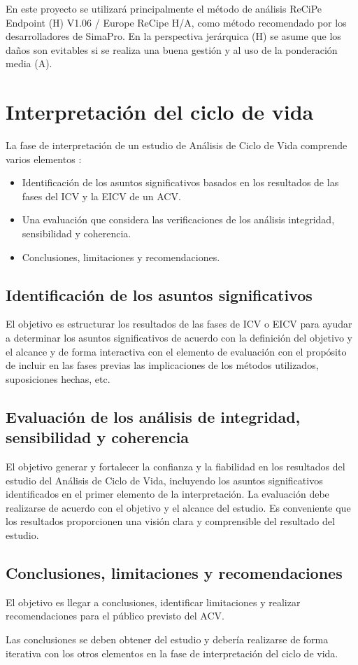 En este proyecto se utilizará principalmente el método de análisis ReCiPe Endpoint (H) V1.06 / Europe ReCipe H/A, como método recomendado por los desarrolladores de SimaPro. En la perspectiva jerárquica (H) se asume que los daños son evitables si se realiza una buena gestión y al uso de la ponderación media (A).

\section{Interpretación del ciclo de vida}

La fase de interpretación de un estudio de Análisis de Ciclo de Vida comprende varios elementos \cite{iso14044}:
\begin{itemize}
  \item Identificación de los asuntos significativos basados en los resultados de las fases del ICV y la EICV de un ACV.
  \item Una evaluación que considera las verificaciones de los análisis integridad, sensibilidad y coherencia.
  \item Conclusiones, limitaciones y recomendaciones.
\end{itemize}

\subsection{Identificación de los asuntos significativos}

El objetivo es estructurar los resultados de las fases de ICV o EICV para ayudar a determinar los asuntos significativos de acuerdo con la definición del objetivo y el alcance y de forma interactiva con el elemento de evaluación con el propósito de incluir en las fases previas las implicaciones de los métodos utilizados, suposiciones hechas, etc.

\subsection{Evaluación de los análisis de integridad, sensibilidad y coherencia}

El objetivo generar y fortalecer la confianza y la fiabilidad en los resultados del estudio del Análisis de Ciclo de Vida, incluyendo los asuntos significativos identificados en el primer elemento de la interpretación. La evaluación debe realizarse de acuerdo con el objetivo y el alcance del estudio. Es conveniente que los resultados proporcionen una visión clara y comprensible del resultado del estudio.

\subsection{Conclusiones, limitaciones y recomendaciones}

El objetivo es llegar a conclusiones, identificar limitaciones y realizar recomendaciones para el público previsto del ACV.

Las conclusiones se deben obtener del estudio y debería realizarse de forma iterativa con los otros elementos en la fase de interpretación del ciclo de vida.
